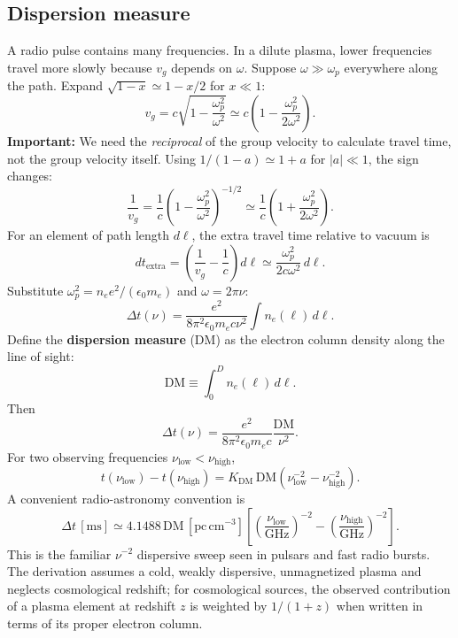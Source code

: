 \documentclass[11pt]{article}
\newcommand{\epsz}{\epsilon_0}
\begin{document}
\subsection{Dispersion measure}
A radio pulse contains many frequencies. In a dilute plasma, lower frequencies travel more slowly because $v_g$ depends on $\omega$. Suppose $\omega\gg\omega_p$ everywhere along the path. Expand $\sqrt{1-x}\simeq1-x/2$ for $x\ll1$:
\begin{equation}
v_g=c\sqrt{1-\frac{\omega_p^2}{\omega^2}}
\simeq c\left(1-\frac{\omega_p^2}{2\omega^2}\right).
\end{equation}
\textbf{Important:} We need the \emph{reciprocal} of the group velocity to calculate travel time, not the group velocity itself. Using $1/(1-a)\simeq1+a$ for $|a|\ll1$, the sign changes:
\begin{equation}
\frac{1}{v_g}=\frac{1}{c}\left(1-\frac{\omega_p^2}{\omega^2}\right)^{-1/2}
\simeq\frac{1}{c}\left(1+\frac{\omega_p^2}{2\omega^2}\right).
\end{equation}
For an element of path length $d\ell$, the extra travel time relative to vacuum is
\begin{equation}
dt_\mathrm{extra}=\left(\frac{1}{v_g}-\frac{1}{c}\right)d\ell
\simeq\frac{\omega_p^2}{2c\omega^2}\,d\ell.
\end{equation}
Substitute $\omega_p^2=n_e e^2/(\epsz m_e)$ and $\omega=2\pi\nu$:
\begin{equation}
\boxed{\Delta t(\nu)=\frac{e^2}{8\pi^2\epsz m_e c\nu^2}\int n_e(\ell)\,d\ell.}
\end{equation}
Define the \textbf{dispersion measure} (DM) as the electron column density along the line of sight:
\begin{equation}
\boxed{\mathrm{DM}\equiv\int_0^D n_e(\ell)\,d\ell.}
\end{equation}
Then
\begin{equation}
\boxed{\Delta t(\nu)=\frac{e^2}{8\pi^2\epsz m_e c}\frac{\mathrm{DM}}{\nu^2}.}
\end{equation}
For two observing frequencies $\nu_\mathrm{low}<\nu_\mathrm{high}$,
\begin{equation}
\boxed{t(\nu_\mathrm{low})-t(\nu_\mathrm{high})
=K_\mathrm{DM}\,\mathrm{DM}\left(\nu_\mathrm{low}^{-2}-\nu_\mathrm{high}^{-2}\right).}
\end{equation}
A convenient radio-astronomy convention is
\begin{equation}
\boxed{\Delta t\,[\mathrm{ms}]\simeq4.1488\,\mathrm{DM}\,[\mathrm{pc\,cm^{-3}}]
\left[\left(\frac{\nu_\mathrm{low}}{\mathrm{GHz}}\right)^{-2}
-\left(\frac{\nu_\mathrm{high}}{\mathrm{GHz}}\right)^{-2}\right].}
\end{equation}
This is the familiar $\nu^{-2}$ dispersive sweep seen in pulsars and fast radio bursts. The derivation assumes a cold, weakly dispersive, unmagnetized plasma and neglects cosmological redshift; for cosmological sources, the observed contribution of a plasma element at redshift $z$ is weighted by $1/(1+z)$ when written in terms of its proper electron column.
\end{document}
